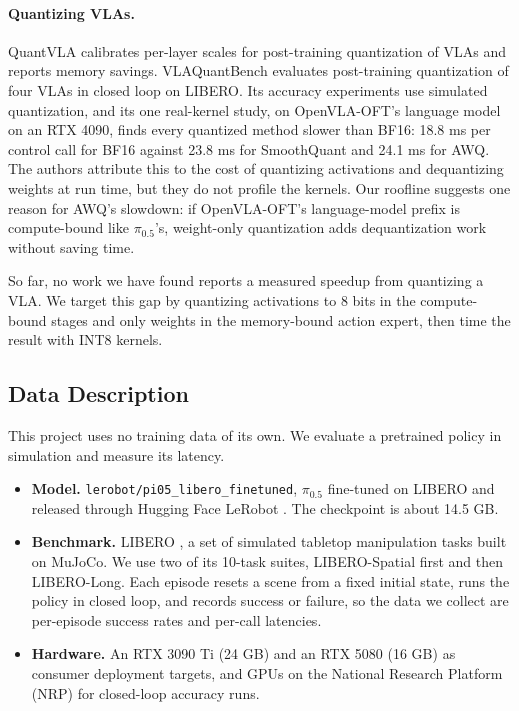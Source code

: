 \documentclass[12pt,letterpaper]{article}
\begin{document}
\paragraph{Quantizing VLAs.} QuantVLA \citep{zhang2026quantvla} calibrates per-layer scales for post-training quantization of VLAs and reports memory savings. VLAQuantBench \citep{xu2026vlaquantbench} evaluates post-training quantization of four VLAs in closed loop on LIBERO. Its accuracy experiments use simulated quantization, and its one real-kernel study, on OpenVLA-OFT's language model on an RTX 4090, finds every quantized method slower than BF16: 18.8 ms per control call for BF16 against 23.8 ms for SmoothQuant and 24.1 ms for AWQ. The authors attribute this to the cost of quantizing activations and dequantizing weights at run time, but they do not profile the kernels. Our roofline suggests one reason for AWQ's slowdown: if OpenVLA-OFT's language-model prefix is compute-bound like $\pi_{0.5}$'s, weight-only quantization adds dequantization work without saving time.

So far, no work we have found reports a measured speedup from quantizing a VLA. We target this gap by quantizing activations to 8 bits in the compute-bound stages and only weights in the memory-bound action expert, then time the result with INT8 kernels.

\subsection{Data Description}

This project uses no training data of its own. We evaluate a pretrained policy in simulation and measure its latency.

\begin{itemize}
    \item \textbf{Model.} \texttt{lerobot/pi05\_libero\_finetuned}, $\pi_{0.5}$ fine-tuned on LIBERO and released through Hugging Face LeRobot \citep{cadene2024lerobot}. The checkpoint is about 14.5 GB.
    \item \textbf{Benchmark.} LIBERO \citep{liu2023libero}, a set of simulated tabletop manipulation tasks built on MuJoCo. We use two of its 10-task suites, LIBERO-Spatial first and then LIBERO-Long. Each episode resets a scene from a fixed initial state, runs the policy in closed loop, and records success or failure, so the data we collect are per-episode success rates and per-call latencies.
    \item \textbf{Hardware.} An RTX 3090 Ti (24 GB) and an RTX 5080 (16 GB) as consumer deployment targets, and GPUs on the National Research Platform (NRP) for closed-loop accuracy runs.
\end{itemize}
\end{document}
